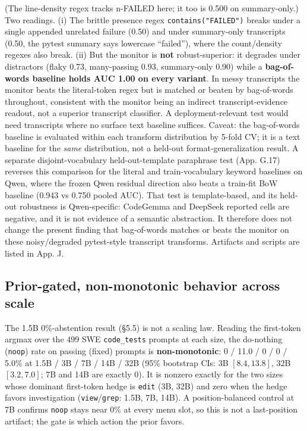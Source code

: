 \documentclass[
  11pt,
  a4paper]{article}
\begin{document}
(The line-density regex tracks n-FAILED here; it too is 0.500 on
summary-only.) Two readings. (i) The brittle presence regex
\texttt{contains("FAILED")} breaks under a single appended unrelated
failure (0.50) and under summary-only transcripts (0.50, the pytest
summary says lowercase ``failed''), where the count/density regexes also
break. (ii) But the monitor is \textbf{not} robust-superior: it degrades
under distractors (flaky 0.73, many-passing 0.93, summary-only 0.90)
while a \textbf{bag-of-words baseline holds AUC 1.00 on every variant}.
In messy transcripts the monitor beats the literal-token regex but is
matched or beaten by bag-of-words throughout, consistent with the
monitor being an indirect transcript-evidence readout, not a superior
transcript classifier. A deployment-relevant test would need transcripts
where no surface text baseline suffices. Caveat: the bag-of-words
baseline is evaluated within each transform distribution by 5-fold CV;
it is a text baseline for the \emph{same} distribution, not a held-out
format-generalization result. A separate disjoint-vocabulary
held-out-template paraphrase test (App. G.17) reverses this comparison
for the literal and train-vocabulary keyword baselines on Qwen, where
the frozen Qwen residual direction also beats a train-fit BoW baseline
(0.943 vs 0.750 pooled AUC). That test is template-based, and its
held-out robustness is Qwen-specific: CodeGemma and DeepSeek reported
cells are negative, and it is not evidence of a semantic abstraction. It
therefore does not change the present finding that bag-of-words matches
or beats the monitor on these noisy/degraded pytest-style transcript
transforms. Artifacts and scripts are listed in App. J.

\subsection{Prior-gated, non-monotonic behavior across
scale}\label{prior-gated-non-monotonic-behavior-across-scale}

The 1.5B 0\%-abstention result (\S{}5.5) is not a scaling law. Reading the
first-token argmax over the 499 SWE \texttt{code\_tests} prompts at each
size, the do-nothing (\texttt{noop}) rate on passing (fixed) prompts is
\textbf{non-monotonic}: 0 / 11.0 / 0 / 0 / 5.0\% at 1.5B / 3B / 7B / 14B
/ 32B (95\% bootstrap CIs: 3B \([8.4,13.8]\), 32B \([3.2,7.0]\); 7B and
14B are exactly 0). It is nonzero exactly for the two sizes whose
dominant first-token hedge is \texttt{edit} (3B, 32B) and zero when the
hedge favors investigation (\texttt{view}/\texttt{grep}: 1.5B, 7B, 14B).
A position-balanced control at 7B confirms \texttt{noop} stays near 0\%
at every menu slot, so this is not a last-position artifact; the gate is
which action the prior favors.
\end{document}
